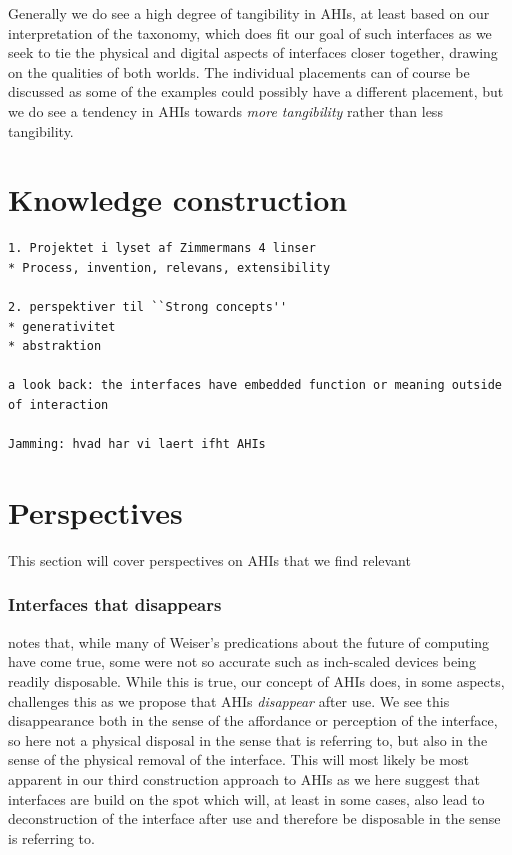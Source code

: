 Generally we do see a high degree of tangibility in AHIs, at least based on our interpretation of the taxonomy, which does fit our goal of such interfaces as we seek to tie the physical and digital aspects of interfaces closer together, drawing on the qualities of both worlds.
The individual placements can of course be discussed as some of the examples could possibly have a different placement, but we do see a tendency in AHIs towards \emph{more tangibility} rather than less tangibility. 

\section{Knowledge construction}

\begin{verbatim}
1. Projektet i lyset af Zimmermans 4 linser
* Process, invention, relevans, extensibility

2. perspektiver til ``Strong concepts''
* generativitet
* abstraktion

a look back: the interfaces have embedded function or meaning outside of interaction

Jamming: hvad har vi laert ifht AHIs
\end{verbatim}

\section{Perspectives}
This section will cover perspectives on AHIs that we find relevant 

\subsubsection{Interfaces that disappears}
\citet{abowd2012next} notes that, while many of Weiser's predications about the future of computing have come true, some were not so accurate such as inch-scaled devices being readily disposable.
While this is true, our concept of AHIs does, in some aspects, challenges this as we propose that AHIs \emph{disappear} after use.
We see this disappearance both in the sense of the affordance or perception of the interface, so here not a physical disposal in the sense that \citeauthor{abowd2012next} is referring to, but also in the sense of the physical removal of the interface.
This will most likely be most apparent in our third construction approach to AHIs as we here suggest that interfaces are build on the spot which will, at least in some cases, also lead to deconstruction of the interface after use and therefore be disposable in the sense \citeauthor{abowd2012next} is referring to.

